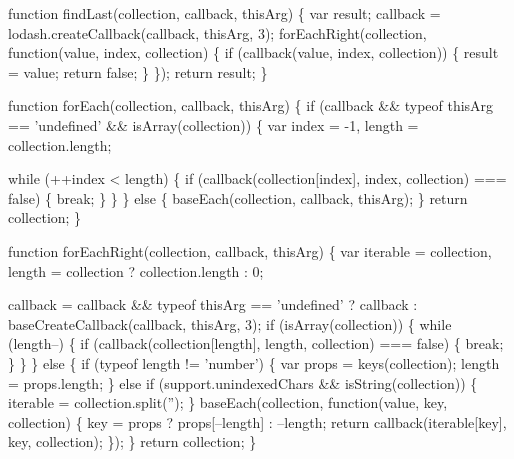\begin{DoxyCodeInclude}
    \textcolor{keyword}{function} findLast(collection, callback, thisArg) \{
      var result;
      callback = lodash.createCallback(callback, thisArg, 3);
      forEachRight(collection, \textcolor{keyword}{function}(value, index, collection) \{
        \textcolor{keywordflow}{if} (callback(value, index, collection)) \{
          result = value;
          \textcolor{keywordflow}{return} \textcolor{keyword}{false};
        \}
      \});
      \textcolor{keywordflow}{return} result;
    \}

    \textcolor{keyword}{function} forEach(collection, callback, thisArg) \{
      \textcolor{keywordflow}{if} (callback && typeof thisArg == \textcolor{stringliteral}{'undefined'} && isArray(collection)) \{
        var index = -1,
            length = collection.length;

        \textcolor{keywordflow}{while} (++index < length) \{
          \textcolor{keywordflow}{if} (callback(collection[index], index, collection) === \textcolor{keyword}{false}) \{
            \textcolor{keywordflow}{break};
          \}
        \}
      \} \textcolor{keywordflow}{else} \{
        baseEach(collection, callback, thisArg);
      \}
      \textcolor{keywordflow}{return} collection;
    \}

    \textcolor{keyword}{function} forEachRight(collection, callback, thisArg) \{
      var iterable = collection,
          length = collection ? collection.length : 0;

      callback = callback && typeof thisArg == \textcolor{stringliteral}{'undefined'} ? callback : baseCreateCallback(callback, 
      thisArg, 3);
      \textcolor{keywordflow}{if} (isArray(collection)) \{
        \textcolor{keywordflow}{while} (length--) \{
          \textcolor{keywordflow}{if} (callback(collection[length], length, collection) === \textcolor{keyword}{false}) \{
            \textcolor{keywordflow}{break};
          \}
        \}
      \} \textcolor{keywordflow}{else} \{
        \textcolor{keywordflow}{if} (typeof length != \textcolor{stringliteral}{'number'}) \{
          var props = keys(collection);
          length = props.length;
        \} \textcolor{keywordflow}{else} \textcolor{keywordflow}{if} (support.unindexedChars && isString(collection)) \{
          iterable = collection.split(\textcolor{stringliteral}{''});
        \}
        baseEach(collection, \textcolor{keyword}{function}(value, key, collection) \{
          key = props ? props[--length] : --length;
          \textcolor{keywordflow}{return} callback(iterable[key], key, collection);
        \});
      \}
      \textcolor{keywordflow}{return} collection;
    \}


\end{DoxyCodeInclude}
